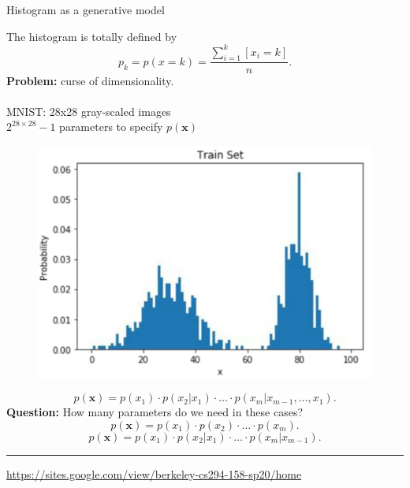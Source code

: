 \documentclass{beamer}
\newcommand{\bx}{\mathbf{x}}
\begin{document}
\begin{frame}{Histogram as a generative model}

\begin{minipage}[t]{0.6\columnwidth}
    The histogram is totally defined by
	\[
	    p_k = p(x = k) = \frac{\sum_{i=1}^k [x_i = k]}{n}.
	\]
	\textbf{Problem:} curse of dimensionality. \\
	\vspace{0.05cm} \\
	MNIST: 28x28 gray-scaled images \\
	$2^{28\times28} - 1$ parameters to specify $p(\bx)$ 
	\end{minipage}%
	\begin{minipage}[t]{0.4\columnwidth}
    \begin{figure}[h]
        \centering
        \includegraphics[width=\linewidth]{figs/histogram.png}
    \end{figure}
\end{minipage}
\[
    p(\bx) = p(x_1) \cdot p(x_2 | x_1) \cdot \dots \cdot p(x_m | x_{m-1}, \dots, x_1).
\]
\textbf{Question:} How many parameters do we need in these cases?
\[
    p(\bx) = p(x_1) \cdot p(x_2)\cdot \dots \cdot p(x_m).
\]
\[
    p(\bx) = p(x_1) \cdot p(x_2 | x_1) \cdot \dots \cdot p(x_m | x_{m-1}).
\]
\vspace{0.05cm}
\hrule\medskip
{\scriptsize  \href{https://sites.google.com/view/berkeley-cs294-158-sp20/home}{https://sites.google.com/view/berkeley-cs294-158-sp20/home}}
\end{frame}
\end{document}
